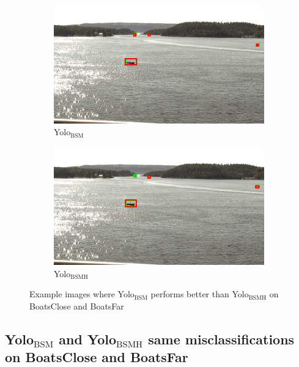 \begin{figure}[h!]
\begin{subfigure}{.5\textwidth}
  \centering
  \includegraphics[width=0.9\linewidth]{results/case_buildings/yolo23/2better/yolo2/selected_08_11_frame0530.jpg}
  \caption{Yolo$_{\text{BSM}}$}
\end{subfigure}%
\begin{subfigure}{.5\textwidth}
  \centering
  \includegraphics[width=.9\linewidth]{results/case_buildings/yolo23/2better/yolo3/selected_08_11_frame0530.jpg}
  \caption{Yolo$_{\text{BSMH}}$}
\end{subfigure}
\caption{Example images where Yolo$_{\text{BSM}}$ performs better than Yolo$_{\text{BSMH}}$ on BoatsClose and BoatsFar}
\label{img:yolo2_better}

\end{figure}

\newpage

\subsection{Yolo$_{\text{BSM}}$ and Yolo$_{\text{BSMH}}$ same misclassifications on BoatsClose and BoatsFar}
\label{sec:same_mistake}


